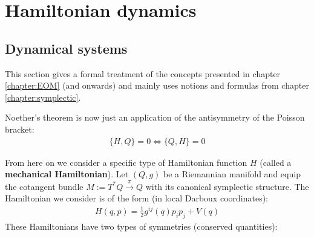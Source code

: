 	
\section{Hamiltonian dynamics}
\subsection{Dynamical systems}

	This section gives a formal treatment of the concepts presented in chapter \ref{chapter:EOM} (and onwards) and mainly uses notions and formulas from chapter \ref{chapter:symplectic}.
	
	
	\begin{result}
		Noether's theorem is now just an application of the antisymmetry of the Poisson bracket:
		\begin{gather}
			\{H, Q\} = 0\iff\{Q, H\} = 0
		\end{gather}
	\end{result}
	
	From here on we consider a specific type of Hamiltonian function $H$ (called a \textbf{mechanical Hamiltonian}). Let $(Q, g)$ be a Riemannian manifold and equip the cotangent bundle $M:=T^*Q\overset{\pi}{\rightarrow}Q$ with its canonical symplectic structure. The Hamiltonian we consider is of the form (in local Darboux coordinates):
	\begin{gather}
		H(q, p) = \frac{1}{2}g^{ij}(q)p_ip_j + V(q)
	\end{gather}
	These Hamiltonians have two types of symmetries (conserved quantities):
	

